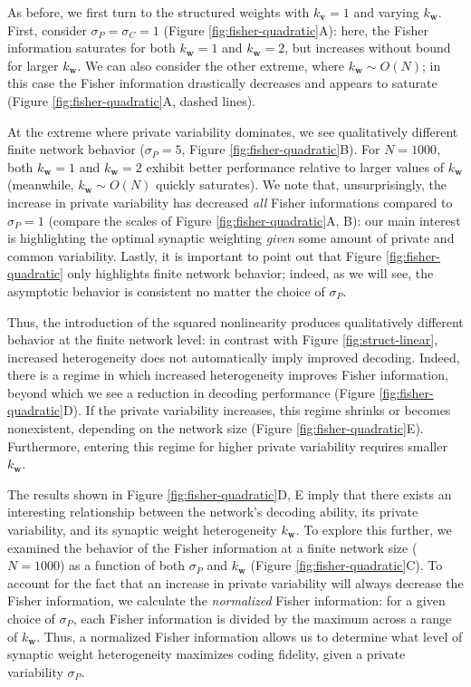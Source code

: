 \documentclass[12pt]{article}
\begin{document}
	As before, we first turn to the structured weights with $k_{\mathbf{v}}=1$ and varying $k_{\mathbf{w}}$. First, consider $\sigma_P= \sigma_C=1$ (Figure \ref{fig:fisher-quadratic}A): here, the Fisher information saturates for both $k_{\mathbf{w}}=1$ and $k_{\mathbf{w}}=2$, but increases without bound for larger $k_{\mathbf{w}}$. We can also consider the other extreme, where $k_{\mathbf{w}}\sim O(N)$; in this case the Fisher information drastically decreases and  appears to saturate (Figure \ref{fig:fisher-quadratic}A, dashed lines). 
	
	At the extreme where private variability dominates, we see qualitatively different finite network behavior ($\sigma_P=5$, Figure \ref{fig:fisher-quadratic}B). For  $N=1000$,  both $k_{\mathbf{w}}=1$ and $k_{\mathbf{w}}=2$ exhibit better performance relative to larger values of $k_{\mathbf{w}}$ (meanwhile, $k_{\mathbf{w}} \sim O(N)$  quickly saturates). We note that, unsurprisingly, the increase in private variability has decreased \textit{all} Fisher informations compared to $\sigma_P=1$ (compare the scales of Figure \ref{fig:fisher-quadratic}A, B): our main interest is highlighting the optimal synaptic weighting \textit{given} some amount of private and common variability. Lastly, it is important to point out that Figure \ref{fig:fisher-quadratic} only highlights finite network behavior; indeed, as we will see, the asymptotic behavior is consistent no matter the choice of $\sigma_P$.
	
	Thus, the introduction of the squared nonlinearity produces qualitatively different behavior at the finite network level: in contrast with Figure \ref{fig:struct-linear}, increased heterogeneity does not automatically imply improved decoding. Indeed, there is a regime in which increased heterogeneity improves Fisher information, beyond which we see a reduction in decoding performance (Figure \ref{fig:fisher-quadratic}D). If the private variability increases, this regime shrinks or becomes nonexistent, depending on the network size (Figure \ref{fig:fisher-quadratic}E). Furthermore, entering this regime for higher private variability requires smaller $k_{\mathbf{w}}$. 
	
	The results shown in Figure \ref{fig:fisher-quadratic}D, E imply that there exists an interesting relationship between the network's decoding ability, its private variability, and its synaptic weight heterogeneity $k_{\mathbf{w}}$. To explore this further, we examined the behavior of the Fisher information at a finite network size ($N=1000$) as a function of both $\sigma_P$ and $k_{\mathbf{w}}$ (Figure \ref{fig:fisher-quadratic}C).  To account for the fact that an increase in private variability will always decrease the Fisher information, we calculate the \textit{normalized} Fisher information: for a given choice of $\sigma_P$, each Fisher information is divided by the maximum across a range of $k_{\mathbf{w}}$. Thus, a normalized Fisher information allows us to determine what level of synaptic weight heterogeneity maximizes coding fidelity, given a private variability $\sigma_P$.
	
\end{document}
